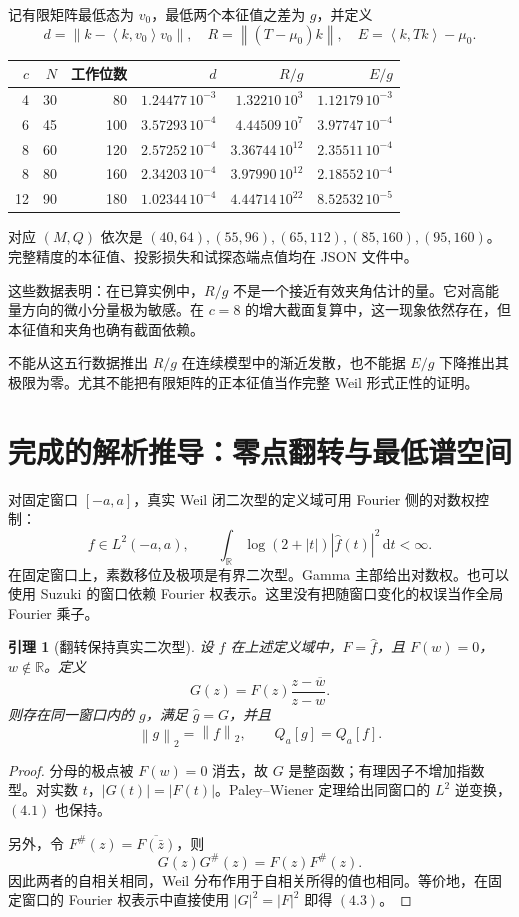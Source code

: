 \documentclass[UTF8,fontset=none,11pt,a4paper]{ctexart}
\newtheorem{lemma}[prop]{引理}
\newcommand{\R}{\mathbb R}\newcommand{\C}{\mathbb C}\newcommand{\N}{\mathbb N}
\newcommand{\dd}{\,\mathrm d}\newcommand{\e}{\mathrm e}\newcommand{\norm}[1]{\left\lVert#1\right\rVert}
\newcommand{\inner}[2]{\left\langle #1,#2\right\rangle}
\begin{document}
记有限矩阵最低态为 $v_0$，最低两个本征值之差为 $g$，并定义
\[
 d=\norm{k-\inner{k}{v_0}v_0},\quad
 R=\norm{(T-\mu_0)k},\quad
 E=\inner{k}{Tk}-\mu_0.
\]
\begin{center}\small
\begin{tabular}{@{}rrrrrr@{}}
\toprule
$c$ & $N$ & 工作位数 & $d$ & $R/g$ & $E/g$\\
\midrule
4 &30 &80  &$1.24477\,10^{-3}$ &$1.32210\,10^{3}$ &$1.12179\,10^{-3}$\\
6 &45 &100 &$3.57293\,10^{-4}$ &$4.44509\,10^{7}$ &$3.97747\,10^{-4}$\\
8 &60 &120 &$2.57252\,10^{-4}$ &$3.36744\,10^{12}$ &$2.35511\,10^{-4}$\\
8 &80 &160 &$2.34203\,10^{-4}$ &$3.97990\,10^{12}$ &$2.18552\,10^{-4}$\\
12&90 &180 &$1.02344\,10^{-4}$ &$4.44714\,10^{22}$ &$8.52532\,10^{-5}$\\
\bottomrule
\end{tabular}
\end{center}
对应 $(M,Q)$ 依次是 $(40,64),(55,96),(65,112),(85,160),(95,160)$。完整精度的本征值、投影损失和试探态端点值均在 JSON 文件中。

这些数据表明：在已算实例中，$R/g$ 不是一个接近有效夹角估计的量。它对高能量方向的微小分量极为敏感。在 $c=8$ 的增大截面复算中，这一现象依然存在，但本征值和夹角也确有截面依赖。

不能从这五行数据推出 $R/g$ 在连续模型中的渐近发散，也不能据 $E/g$ 下降推出其极限为零。尤其不能把有限矩阵的正本征值当作完整 Weil 形式正性的证明。

\section{完成的解析推导：零点翻转与最低谱空间}
对固定窗口 $[-a,a]$，真实 Weil 闭二次型的定义域可用 Fourier 侧的对数权控制：
\[
 f\in L^2(-a,a),\qquad
 \int_\R\log(2+|t|)|\widehat f(t)|^2\dd t<\infty. \tag{4.1}
\]
在固定窗口上，素数移位及极项是有界二次型。Gamma 主部给出对数权。也可以使用 Suzuki 的窗口依赖 Fourier 权表示。这里没有把随窗口变化的权误当作全局 Fourier 乘子。

\begin{lemma}[翻转保持真实二次型]
设 $f$ 在上述定义域中，$F=\widehat f$，且 $F(w)=0$，$w\notin\R$。定义
\[
 G(z)=F(z)\frac{z-\overline w}{z-w}. \tag{4.2}
\]
则存在同一窗口内的 $g$，满足 $\widehat g=G$，并且
\[
 \norm g_2=\norm f_2,\qquad Q_a[g]=Q_a[f]. \tag{4.3}
\]
\end{lemma}
\begin{proof}
分母的极点被 $F(w)=0$ 消去，故 $G$ 是整函数；有理因子不增加指数型。对实数 $t$，$|G(t)|=|F(t)|$。Paley--Wiener 定理给出同窗口的 $L^2$ 逆变换，$(4.1)$ 也保持。

另外，令 $F^\#(z)=\overline{F(\bar z)}$，则
\[
 G(z)G^\#(z)=F(z)F^\#(z).
\]
因此两者的自相关相同，Weil 分布作用于自相关所得的值也相同。等价地，在固定窗口的 Fourier 权表示中直接使用 $|G|^2=|F|^2$ 即得 $(4.3)$。
\end{proof}
\end{document}

